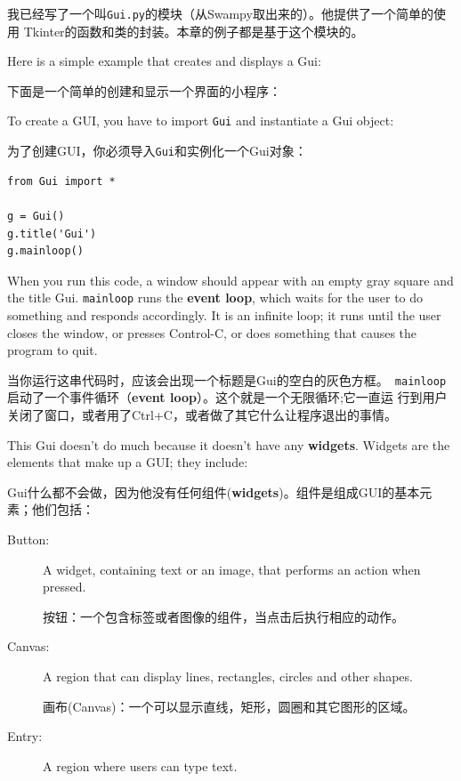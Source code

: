 \documentclass[10pt]{book}
\begin{document}
\begin{CJK}{UTF8}{gbsn}
我已经写了一个叫{\tt Gui.py}的模块（从Swampy取出来的）。他提供了一个简单的使用
Tkinter的函数和类的封装。本章的例子都是基于这个模块的。

Here is a simple example that creates and displays a Gui:

下面是一个简单的创建和显示一个界面的小程序：

To create a GUI, you have to import {\tt Gui} and instantiate
a Gui object:

为了创建GUI，你必须导入{\tt Gui}和实例化一个Gui对象：

\begin{verbatim}
from Gui import *

g = Gui()
g.title('Gui')
g.mainloop()
\end{verbatim}
%
When you run this code, a window should appear with an empty gray
square and the title {\sf Gui}.  {\tt mainloop} runs the {\bf event
  loop}, which waits for the user to do something and responds
accordingly.  It is an infinite loop; it runs until the user closes
the window, or presses Control-C, or does something that causes the
program to quit.

当你运行这串代码时，应该会出现一个标题是{\sf Gui}的空白的灰色方框。{\tt
mainloop}启动了一个事件循环（{\bf event loop}）。这个就是一个无限循环;它一直运
行到用户关闭了窗口，或者用了Ctrl+C，或者做了其它什么让程序退出的事情。

This Gui doesn't do much because it doesn't have any
{\bf widgets}.  Widgets are the elements that make up a
GUI; they include:

Gui什么都不会做，因为他没有任何组件({\bf widgets})。组件是组成GUI的基本元素；他们包括：

\begin{description}

\item[Button:] A widget, containing text or an image, that
performs an action when pressed.

按钮：一个包含标签或者图像的组件，当点击后执行相应的动作。

\item[Canvas:] A region that can display lines, rectangles,
circles and other shapes.

画布(Canvas)：一个可以显示直线，矩形，圆圈和其它图形的区域。

\item[Entry:] A region where users can type text.


\end{description}
\end{CJK}
\end{document}
